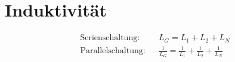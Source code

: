 \section*{Induktivität}

\begin{tcolorbox}[colback=white]
    \begin{align*}
        \text{Serienschaltung:}   &  & L_G = L_1 + L_2 + L_N                                         \\
        \text{Parallelschaltung:} &  & \frac{1}{L_G} = \frac{1}{L_1} + \frac{1}{L_2} + \frac{1}{L_N} \\
    \end{align*}
\end{tcolorbox}